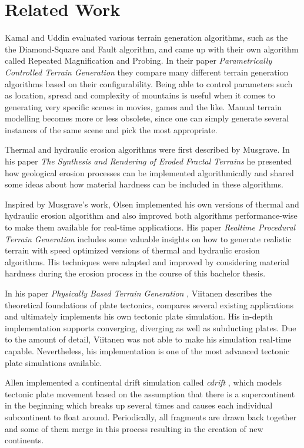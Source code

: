 \documentclass[11pt,a4paper,twoside,openright]{report}
\begin{document}
\chapter{Related Work}
\label{sec:related}
Kamal and Uddin evaluated various terrain generation algorithms, such as the the Diamond-Square and Fault algorithm, and came up with their own algorithm called Repeated Magnification and Probing. In their paper \emph{Parametrically Controlled Terrain Generation} \cite{Kamal:2007:PCT:1321261.1321264} they compare many different terrain generation algorithms based on their configurability. Being able to control parameters such as location, spread and complexity of mountains is useful when it comes to generating very specific scenes in movies, games and the like. Manual terrain modelling becomes more or less obsolete, since one can simply generate several instances of the same scene and pick the most appropriate.

Thermal and hydraulic erosion algorithms were first described by Musgrave. In his paper  \emph{The Synthesis and Rendering of Eroded Fractal Terrains} \cite{Musgrave:1989:SRE:74333.74337} he presented how geological erosion processes can be implemented algorithmically and shared some ideas about how material hardness can be included in these algorithms.

Inspired by Musgrave's work, Olsen implemented his own versions of thermal and hydraulic erosion algorithm and also improved both algorithms performance-wise to make them available for real-time applications. His paper \emph{Realtime Procedural Terrain Generation} \cite{Olsen:2004} includes some valuable insights on how to generate realistic terrain with speed optimized versions of thermal and hydraulic erosion algorithms. His techniques were adapted and improved by considering material hardness during the erosion process in the course of this bachelor thesis.

In his paper \emph{Physically Based Terrain Generation} \cite{Viitanen:2012}, Viitanen describes the theoretical foundations of plate tectonics, compares several existing applications and ultimately implements his own tectonic plate simulation. His in-depth implementation supports converging, diverging as well as subducting plates. Due to the amount of detail, Viitanen was not able to make his simulation real-time capable. Nevertheless, his implementation is one of the most advanced tectonic plate simulations available.

Allen implemented a continental drift simulation called \emph{cdrift} \cite{Allen:1991}, which models tectonic plate movement based on the assumption that there is a supercontinent in the beginning which breaks up several times and causes each individual subcontinent to float around. Periodically, all fragments are drawn back together and some of them merge in this process resulting in the creation of new continents.
\end{document}
